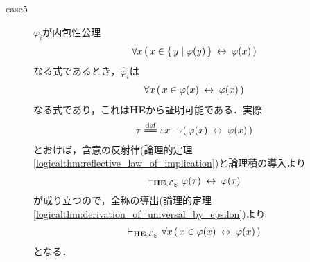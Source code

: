 \begin{metaprf}
\begin{description}
			\item[case5] $\varphi_{i}$が内包性公理
				\begin{align}
					\forall x\, (\, x \in \{\, y \mid \varphi(y)\, \} \hspace{0.25em}\leftrightarrow\hspace{0.25em} \varphi(x)\, )
				\end{align}
				なる式であるとき，$\widehat{\varphi}_{i}$は
				\begin{align}
					\forall x\, (\, x \in \varphi(x) \hspace{0.25em}\leftrightarrow\hspace{0.25em} \varphi(x)\, )
				\end{align}
				なる式であり，これは{\bf HE}から証明可能である．実際
				\begin{align}
					\tau \defeq \varepsilon x \negation (\, \varphi(x) \lrarrow \varphi(x)\, )
				\end{align}
				とおけば，含意の反射律(論理的定理\ref{logicalthm:reflective_law_of_implication})と論理積の導入より
				\begin{align}
					\provable{\mbox{{\bf HE}},\lang{\varepsilon}} \varphi(\tau) \lrarrow \varphi(\tau)
				\end{align}
				が成り立つので，全称の導出(論理的定理\ref{logicalthm:derivation_of_universal_by_epsilon})より
				\begin{align}
					\provable{\mbox{{\bf HE}},\lang{\varepsilon}} \forall x\, (\, x \in \varphi(x) \lrarrow \varphi(x)\, )
				\end{align}
				となる．
			

\end{description}
\end{metaprf}

